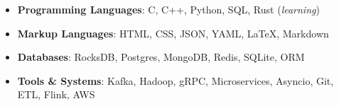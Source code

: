 \begin{itemize}\setlength\itemsep{0.4em}
	\item \textbf{Programming Languages}: C, C++, Python, SQL, Rust (\textit{learning})
	\item \textbf{Markup Languages}: HTML, CSS, JSON, YAML, \LaTeX, Markdown
	\item \textbf{Databases}: RocksDB, Postgres, MongoDB, Redis, SQLite, ORM
	\item \textbf{Tools \& Systems}: Kafka, Hadoop, gRPC, Microservices, Asyncio, Git, ETL, Flink, AWS
\end{itemize}